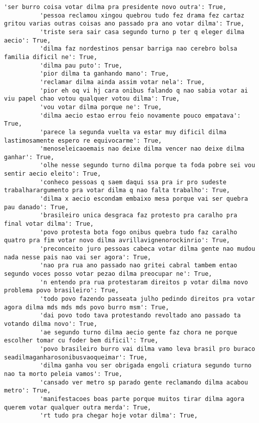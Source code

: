\documentclass[11pt]{article}
\begin{document}
\begin{Verbatim}[commandchars=\\\{\}]
          'ser burro coisa votar dilma pra presidente novo outra': True,
          'pessoa reclamou xingou quebrou tudo fez drama fez cartaz gritou varias outras coisas ano passado pra ano votar dilma': True,
          'triste sera sair casa segundo turno p ter q eleger dilma aecio': True,
          'dilma faz nordestinos pensar barriga nao cerebro bolsa familia dificil ne': True,
          'dilma pau puto': True,
          'pior dilma ta ganhando mano': True,
          'reclamar dilma ainda assim votar nela': True,
          'pior eh oq vi hj cara onibus falando q nao sabia votar ai viu papel chao votou qualquer votou dilma': True,
          'vou votar dilma porque ne': True,
          'dilma aecio estao errou feio novamente pouco empatava': True,
          'parece la segunda vuelta va estar muy dificil dilma lastimosamente espero re equivocarme': True,
          'menoseleicaoemais nao deixe dilma vencer nao deixe dilma ganhar': True,
          'olhe nesse segundo turno dilma porque ta foda pobre sei vou sentir aecio eleito': True,
          'conheco pessoas q saem daqui ssa pra ir pro sudeste trabalharargumento pra votar dilma q nao falta trabalho': True,
          'dilma x aecio escondam embaixo mesa porque vai ser quebra pau danado': True,
          'brasileiro unica desgraca faz protesto pra caralho pra final votar dilma': True,
          'povo protesta bota fogo onibus quebra tudo faz caralho quatro pra fim votar novo dilma avrillavignenorockinrio': True,
          'preconceito juro pessoas cabeca votar dilma gente nao mudou nada nesse pais nao vai ser agora': True,
          'nao pra rua ano passado nao gritei cabral tambem entao segundo voces posso votar pezao dilma preocupar ne': True,
          'n entendo pra rua protestaram direitos p votar dilma novo problema povo brasileiro': True,
          'todo povo fazendo passeata julho pedindo direitos pra votar agora dilma mds mds mds povo burro msm': True,
          'dai povo todo tava protestando revoltado ano passado ta votando dilma novo': True,
          'ae segundo turno dilma aecio gente faz chora ne porque escolher tomar cu foder bem dificil': True,
          'povo brasileiro burro vai dilma vamo leva brasil pro buraco seadilmaganharosonibusvaoqueimar': True,
          'dilma ganha vou ser obrigada engoli criatura segundo turno nao ta morto peleia vamos': True,
          'cansado ver metro sp parado gente reclamando dilma acabou metro': True,
          'manifestacoes boas parte porque muitos tirar dilma agora querem votar qualquer outra merda': True,
          'rt tudo pra chegar hoje votar dilma': True,

\end{Verbatim}
\end{document}

